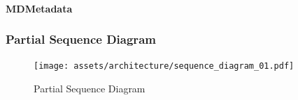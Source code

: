        \paragraph{MDMetadata}
            

    \subsubsection{Partial Sequence Diagram }

        \begin{figure}[H]
            \centering
            \texttt{[image: assets/architecture/sequence\_diagram\_01.pdf]}
            \caption{Partial Sequence Diagram}
            \label{fig:seq_dia}
        \end{figure}
